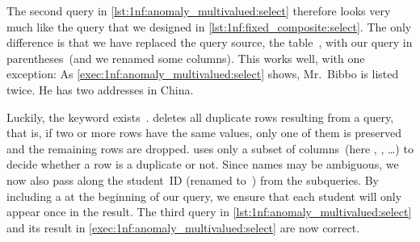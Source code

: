 The second query in \cref{lst:1nf:anomaly_multivalued:select} therefore looks very much like the query that we designed in \cref{lst:1nf:fixed_composite:select}.
The only difference is that we have replaced the query source, the table~, with our  query in parentheses~(and we renamed some columns).
This works well, with one exception:
As \cref{exec:1nf:anomaly_multivalued:select} shows, Mr.~Bibbo is listed twice.
He has two addresses in China.

Luckily, the  keyword exists~\cite{PGDG:PD:SC:S}.
 deletes all duplicate rows resulting from a query, that is, if two or more rows have the same values, only one of them is preserved and the remaining rows are dropped.
 uses only a subset of columns~(here , , \dots) to decide whether a row is a duplicate or not.
Since names may be ambiguous, we now also pass along the student~ID (renamed to~) from the subqueries.
By including a  at the beginning of our query, we ensure that each student will only appear once in the result.
The third query in \cref{lst:1nf:anomaly_multivalued:select} and its result in \cref{exec:1nf:anomaly_multivalued:select} are now correct.

